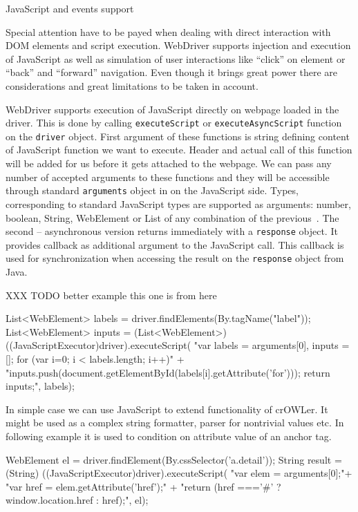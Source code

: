 \sec JavaScript and events support

Special attention have to be payed when dealing with direct interaction with
DOM elements and script execution. WebDriver supports injection and execution
of JavaScript as well as simulation of user interactions like ``click'' on
element or ``back'' and ``forward'' navigation. Even though it brings great
power there are considerations and great limitations to be taken in account. 

WebDriver supports execution of JavaScript directly on webpage loaded in the
driver. This is done by calling {\tt executeScript} or {\tt executeAsyncScript}
function on the {\tt driver} object. First argument of these functions is
string defining content of JavaScript function we want to execute. Header and
actual call of this function will be added for us before it gets attached to
the webpage. We can pass any number of accepted arguments to these functions
and they will be accessible through standard {\tt arguments} object in on the
JavaScript side. Types, corresponding to standard JavaScript types are
supported as arguments: number, boolean, String, WebElement or List of any
combination of the previous~. The second -- asynchronous version returns
immediately with a {\tt response} object. It provides callback as additional
argument to the JavaScript call. This callback is used for synchronization when
accessing the result on the {\tt response} object from Java.  

XXX TODO better example this one is from
here~

\begtt
List<WebElement> labels = driver.findElements(By.tagName("label"));
List<WebElement> inputs = (List<WebElement>) ((JavaScriptExecutor)driver).executeScript(
    "var labels = arguments[0], inputs = []; for (var i=0; i < labels.length; i++){" +
    "inputs.push(document.getElementById(labels[i].getAttribute('for'))); } return inputs;", labels);
\endtt

In simple case we can use JavaScript to extend functionality of crOWLer. It
might be used as a complex string formatter, parser for nontrivial values etc. 
In following example it is used to condition on attribute value of an anchor
tag. 

\begtt
WebElement el = driver.findElement(By.cssSelector('a.detail'));
String result = (String) ((JavaScriptExecutor)driver).executeScript(
"var elem = arguments[0];"+
"var href = elem.getAttribute('href');" +
"return (href ==='#' ? window.location.href : href);", el);
\endtt

